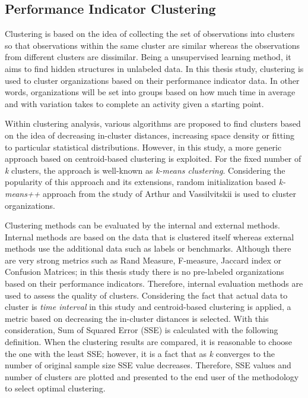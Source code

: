\subsection{Performance Indicator Clustering}
\label{subsec:performance-indicator-clustering}

Clustering is based on the idea of collecting the set of observations into clusters so that observations within the same cluster are similar whereas the observations from different clusters are dissimilar. Being a unsupervised learning method, it aims to find hidden structures in unlabeled data. In this thesis study, clustering is used to cluster organizations based on their performance indicator data. In other words, organizations will be set into groups based on how much time in average and with variation takes to complete an activity given a starting point.

Within clustering analysis, various algorithms are proposed to find clusters based on the idea of decreasing in-cluster distances, increasing space density or fitting to particular statistical distributions. However, in this study, a more generic approach based on centroid-based clustering is exploited. For the fixed number of \textit{k} clusters, the approach is well-known as \textit{k-means clustering}. Considering the popularity of this approach and its extensions, random initialization based \textit{k-means++} approach from the study of Arthur and Vassilvitskii \cite{arthur2007} is used to cluster organizations. 

Clustering methods can be evaluated by the internal and external methods. Internal methods are based on the data that is clustered itself whereas external methods use the additional data such as labels or benchmarks. Although there are very strong metrics such as Rand Measure, F-measure, Jaccard index or Confusion Matrices; in this thesis study there is no pre-labeled organizations based on their performance indicators. Therefore, internal evaluation methods are used to assess the quality of clusters. Considering the fact that actual data to cluster is \textit{time interval} in this study and centroid-based clustering is applied, a metric based on decreasing the in-cluster distances is selected. With this consideration, Sum of Squared Error (SSE) is calculated with the following definition. When the clustering results are compared, it is reasonable to choose the one with the least SSE; however, it is a fact that as \textit{k} converges to the number of original sample size SSE value decreases. Therefore, SSE values and number of clusters are plotted and presented to the end user of the methodology to select optimal clustering.

